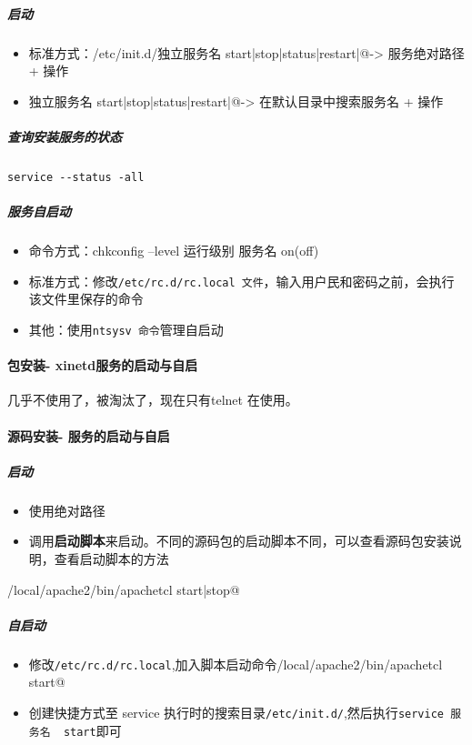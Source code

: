 \documentclass[UTF8,a4paper,12pt]{ctexbook}
\begin{document}
			\subparagraph{启动}
				\begin{itemize}[itemindent = 1em]
					\item 标准方式：\verb@/etc/init.d/独立服务名  start|stop|status|restart|@-> 服务绝对路径 + 操作
					\item \verb@service 独立服务名 start|stop|status|restart|@-> 在默认目录中搜索服务名 + 操作
				\end{itemize}
			
			\subparagraph{查询安装服务的状态}
				\verb|service --status -all|
			
			\subparagraph{服务自启动}
				\begin{itemize}[itemindent = 1em]
					\item 命令方式：chkconfig --level 运行级别 服务名 on(off)
					\item 标准方式：修改\verb|/etc/rc.d/rc.local 文件|，输入用户民和密码之前，会执行该文件里保存的命令
					\item 其他：使用\verb|ntsysv 命令|管理自启动
				\end{itemize}
			
		\paragraph{包安装- xinetd服务的启动与自启}几乎不使用了，被淘汰了，现在只有telnet 在使用。
		
		\paragraph{源码安装- 服务的启动与自启}
			\subparagraph{启动}
				\begin{itemize}[itemindent = 1em]
					\item 使用绝对路径
					\item 调用\textbf{启动脚本}来启动。不同的源码包的启动脚本不同，可以查看源码包安装说明，查看启动脚本的方法
				\end{itemize}
				
				\verb@usr/local/apache2/bin/apachetcl   start|stop@
		
			\subparagraph{自启动}
				\begin{itemize}[itemindent = 1em]
					\item 修改\verb|/etc/rc.d/rc.local|,加入脚本启动命令\verb@usr/local/apache2/bin/apachetcl   start@
					\item 创建快捷方式至 service 执行时的搜索目录\verb|/etc/init.d/|,然后执行\verb|service 服务名  start|即可
				\end{itemize}
				
\end{document}
